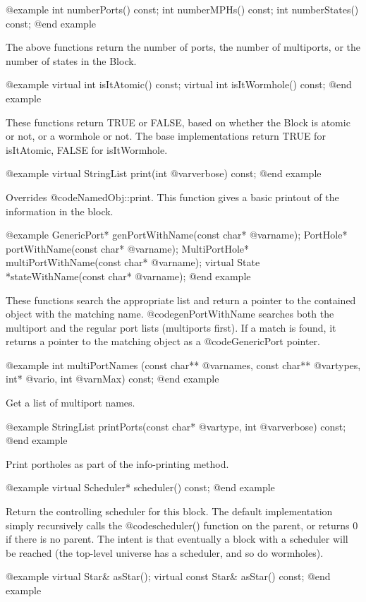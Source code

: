 @example
int numberPorts() const;
int numberMPHs() const;
int numberStates() const;
@end example

The above functions return the number of ports, the number of
multiports, or the number of states in the Block.

@example
virtual int isItAtomic() const;
virtual int isItWormhole() const;
@end example

These functions return TRUE or FALSE, based on whether the Block is
atomic or not, or a wormhole or not.  The base implementations return
TRUE for isItAtomic, FALSE for isItWormhole.

@example
virtual StringList print(int @var{verbose}) const;
@end example

Overrides @code{NamedObj::print}.  This function gives a basic printout of
the information in the block.

@example
GenericPort* genPortWithName(const char* @var{name});
PortHole* portWithName(const char* @var{name});
MultiPortHole* multiPortWithName(const char* @var{name});
virtual State *stateWithName(const char* @var{name});
@end example

These functions search the appropriate list and return a pointer
to the contained object with the matching name.  @code{genPortWithName}
searches both the multiport and the regular port lists (multiports
first).  If a match is found, it returns a pointer to the matching
object as a @code{GenericPort} pointer.

@example
int multiPortNames (const char** @var{names}, const char** @var{types},
                    int* @var{io}, int @var{nMax}) const;
@end example

Get a list of multiport names.

@example
StringList printPorts(const char* @var{type}, int @var{verbose}) const;
@end example

Print portholes as part of the info-printing method.

@example
virtual Scheduler* scheduler() const;
@end example

Return the controlling scheduler for this block.  The default
implementation simply recursively calls the @code{scheduler()} function on the parent, or returns 0
if there is no parent.  The intent is that eventually a block with
a scheduler will be reached (the top-level universe has a scheduler,
and so do wormholes).

@example
virtual Star& asStar();
virtual const Star& asStar() const;
@end example

